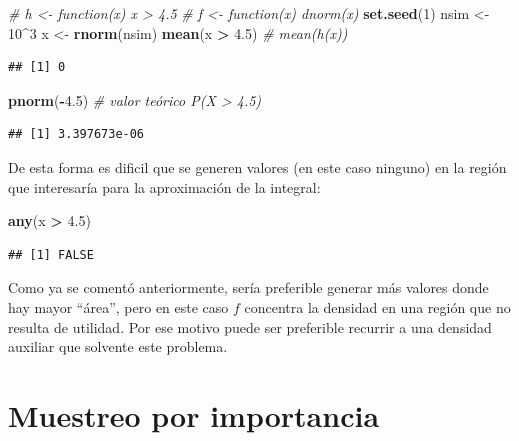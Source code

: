\documentclass[
]{book}
\newenvironment{Shaded}{\begin{snugshade}}{\end{snugshade}}
\newcommand{\CommentTok}[1]{\textcolor[rgb]{0.56,0.35,0.01}{\textit{#1}}}
\newcommand{\DecValTok}[1]{\textcolor[rgb]{0.00,0.00,0.81}{#1}}
\newcommand{\FloatTok}[1]{\textcolor[rgb]{0.00,0.00,0.81}{#1}}
\newcommand{\KeywordTok}[1]{\textcolor[rgb]{0.13,0.29,0.53}{\textbf{#1}}}
\newcommand{\NormalTok}[1]{#1}
\newcommand{\OperatorTok}[1]{\textcolor[rgb]{0.81,0.36,0.00}{\textbf{#1}}}
\newcommand{\StringTok}[1]{\textcolor[rgb]{0.31,0.60,0.02}{#1}}
\theoremstyle{break}
\theoremstyle{definition}
\theoremstyle{definition}
\theoremstyle{definition}
\theoremstyle{remark}
\begin{document}
\begin{Shaded}
\begin{Highlighting}[]
\CommentTok{# h <- function(x) x > 4.5}
\CommentTok{# f <- function(x) dnorm(x)}
\KeywordTok{set.seed}\NormalTok{(}\DecValTok{1}\NormalTok{)}
\NormalTok{nsim <-}\StringTok{ }\DecValTok{10}\OperatorTok{^}\DecValTok{3}
\NormalTok{x <-}\StringTok{ }\KeywordTok{rnorm}\NormalTok{(nsim)}
\KeywordTok{mean}\NormalTok{(x }\OperatorTok{>}\StringTok{ }\FloatTok{4.5}\NormalTok{) }\CommentTok{# mean(h(x))}
\end{Highlighting}
\end{Shaded}

\begin{verbatim}
## [1] 0
\end{verbatim}

\begin{Shaded}
\begin{Highlighting}[]
\KeywordTok{pnorm}\NormalTok{(}\OperatorTok{-}\FloatTok{4.5}\NormalTok{)  }\CommentTok{# valor teórico P(X > 4.5) }
\end{Highlighting}
\end{Shaded}

\begin{verbatim}
## [1] 3.397673e-06
\end{verbatim}

De esta forma es dificil que se generen valores (en este caso ninguno)
en la región que interesaría para la aproximación de la integral:

\begin{Shaded}
\begin{Highlighting}[]
\KeywordTok{any}\NormalTok{(x }\OperatorTok{>}\StringTok{ }\FloatTok{4.5}\NormalTok{)}
\end{Highlighting}
\end{Shaded}

\begin{verbatim}
## [1] FALSE
\end{verbatim}

Como ya se comentó anteriormente, sería preferible generar más valores donde hay mayor ``área'',
pero en este caso \(f\) concentra la densidad en una región que no resulta de utilidad.
Por ese motivo puede ser preferible recurrir a una densidad auxiliar que solvente este problema.

\hypertarget{muestreo-importancia}{%
\section{Muestreo por importancia}\label{muestreo-importancia}}
\end{document}
